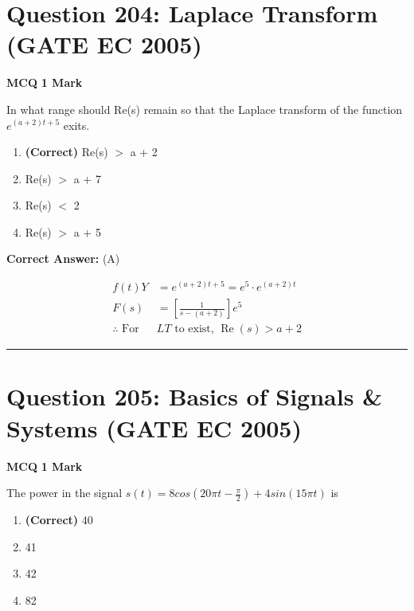 \documentclass[11pt,a4paper]{article}
\begin{document}
\section*{Question 204: Laplace Transform (GATE EC 2005)}
\noindent \textbf{\color{primary}MCQ} \hfill \textbf{\color{secondary}1 Mark}


\noindent In what range should Re(s) remain so that the Laplace transform of the
function $e^{(a+2)t+5}$ exits.


\begin{enumerate}[label=(\Alph*)]
    \item \textbf{(Correct)} Re(s) $>$ a + 2
    \item Re(s) $>$ a + 7
    \item Re(s) $<$ 2
    \item Re(s) $>$ a + 5
\end{enumerate}

\noindent \textbf{Correct Answer:} (A)

\begin{tcolorbox}[solbox, title=Detailed Solution -- Question 204]
\[
\begin{aligned} f(t)Y&=e^{(a+2) t+5}=e^{5} \cdot e^{(a+2) t} \\ F(s)&=\left[\frac{1}{s-(a+2)}\right] e^{5} \\ \therefore \text { For } &L T \text { to exist, } \operatorname{Re}(s)>a+2 \end{aligned}
\]
\end{tcolorbox}

\vspace{1.5em}
\hrule
\vspace{1.5em}

\section*{Question 205: Basics of Signals \& Systems (GATE EC 2005)}
\noindent \textbf{\color{primary}MCQ} \hfill \textbf{\color{secondary}1 Mark}


\noindent The power in the signal 
 $s(t)=8cos(20\pi t -\frac{\pi }{2})+4sin(15\pi t)$ is


\begin{enumerate}[label=(\Alph*)]
    \item \textbf{(Correct)} 40
    \item 41
    \item 42
    \item 82
\end{enumerate}
\end{document}
